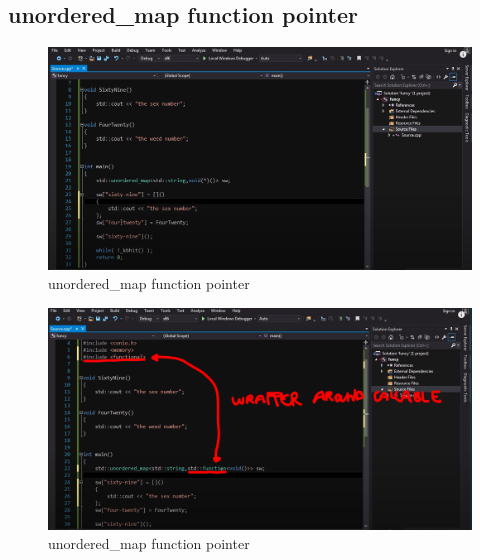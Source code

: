 \subsection{unordered\_map function pointer}

\begin{figure}[H]
	\centering
	\includegraphics[width=1\textwidth, height=1\textheight, keepaspectratio]{./imgs/function_pointers_unordered_map_pointer_to_a_function_lambda_function.png}
	\caption{unordered\_map function pointer}
	\label{fig:function_pointers_unordered_map_pointer_to_a_function_lambda_function}
\end{figure}

\begin{figure}[H]
	\centering
	\includegraphics[width=1\textwidth, height=1\textheight, keepaspectratio]{./imgs/function_pointers_unordered_map_functional_std_function.png}
	\caption{unordered\_map function pointer}
	\label{fig:function_pointers_unordered_map_functional_std_function}
\end{figure}


